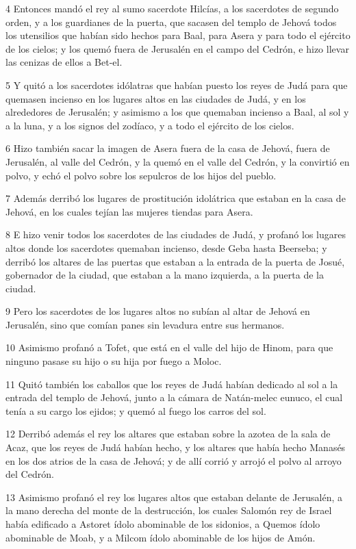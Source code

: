 \par 4 Entonces mandó el rey al sumo sacerdote Hilcías, a los sacerdotes de segundo orden, y a los guardianes de la puerta, que sacasen del templo de Jehová todos los utensilios que habían sido hechos para Baal, para Asera y para todo el ejército de los cielos; y los quemó fuera de Jerusalén en el campo del Cedrón, e hizo llevar las cenizas de ellos a Bet-el.
\par 5 Y quitó a los sacerdotes idólatras que habían puesto los reyes de Judá para que quemasen incienso en los lugares altos en las ciudades de Judá, y en los alrededores de Jerusalén; y asimismo a los que quemaban incienso a Baal, al sol y a la luna, y a los signos del zodíaco, y a todo el ejército de los cielos. 
\par 6 Hizo también sacar la imagen de Asera fuera de la casa de Jehová, fuera de Jerusalén, al valle del Cedrón, y la quemó en el valle del Cedrón, y la convirtió en polvo, y echó el polvo sobre los sepulcros de los hijos del pueblo. 
\par 7 Además derribó los lugares de prostitución idolátrica que estaban en la casa de Jehová, en los cuales tejían las mujeres tiendas para Asera.
\par 8 E hizo venir todos los sacerdotes de las ciudades de Judá, y profanó los lugares altos donde los sacerdotes quemaban incienso, desde Geba hasta Beerseba; y derribó los altares de las puertas que estaban a la entrada de la puerta de Josué, gobernador de la ciudad, que estaban a la mano izquierda, a la puerta de la ciudad.
\par 9 Pero los sacerdotes de los lugares altos no subían al altar de Jehová en Jerusalén, sino que comían panes sin levadura entre sus hermanos.
\par 10 Asimismo profanó a Tofet, que está en el valle del hijo de Hinom, para que ninguno pasase su hijo o su hija por fuego a Moloc. 
\par 11 Quitó también los caballos que los reyes de Judá habían dedicado al sol a la entrada del templo de Jehová, junto a la cámara de Natán-melec eunuco, el cual tenía a su cargo los ejidos; y quemó al fuego los carros del sol.
\par 12 Derribó además el rey los altares que estaban sobre la azotea de la sala de Acaz, que los reyes de Judá habían hecho, y los altares que había hecho Manasés en los dos atrios de la casa de Jehová; y de allí corrió y arrojó el polvo al arroyo del Cedrón.
\par 13 Asimismo profanó el rey los lugares altos que estaban delante de Jerusalén, a la mano derecha del monte de la destrucción, los cuales Salomón rey de Israel había edificado a Astoret ídolo abominable de los sidonios, a Quemos ídolo abominable de Moab, y a Milcom ídolo abominable de los hijos de Amón. 
